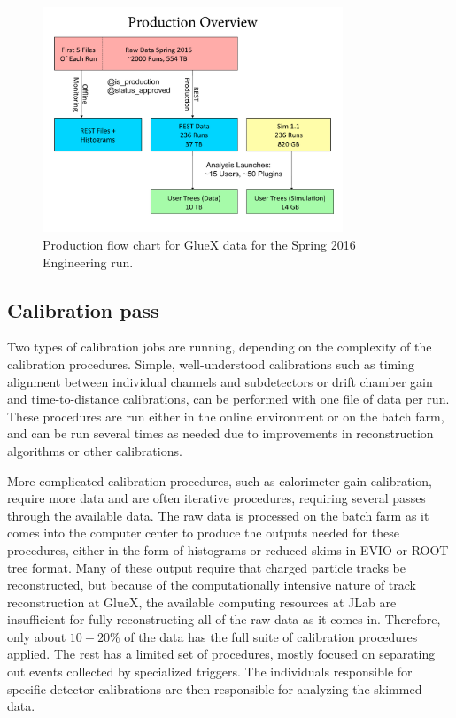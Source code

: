 \begin{figure}[h!]\centering
\includegraphics[width=0.8\textwidth]{figures/Production_Spring_2016.pdf}
\caption[]{\label{fig:production_overview}Production flow chart for GlueX data for the Spring 2016 
Engineering run.} 
\end{figure}

\subsection{Calibration pass \label{sec:reccalibration}}

Two types of calibration jobs are running, depending on the complexity of the calibration procedures.  Simple, well-understood calibrations such as timing alignment between individual channels and subdetectors or drift chamber gain and time-to-distance calibrations, can be performed with one file of data per run.  These procedures are run either in the online environment or on the batch farm, and can be run several times as needed due to improvements in reconstruction algorithms or other calibrations.

More complicated calibration procedures, such as calorimeter gain calibration, require more data and are often iterative procedures, requiring several passes through the available data.  The raw data is processed on the batch farm as it comes into the computer center to produce the outputs needed for these procedures, either in the form of histograms or reduced skims in EVIO or ROOT tree format.  Many of these output require that charged particle tracks be reconstructed, but because of the computationally intensive nature of track reconstruction at GlueX, the available computing resources at JLab are insufficient for fully reconstructing all of the raw data as it comes in.  Therefore, only about $10-20$\% of the data has the full suite of calibration procedures applied.  The rest has a limited set of procedures, mostly focused on separating out events collected by specialized triggers. 
The individuals responsible for specific detector calibrations are then responsible for analyzing the skimmed data.

